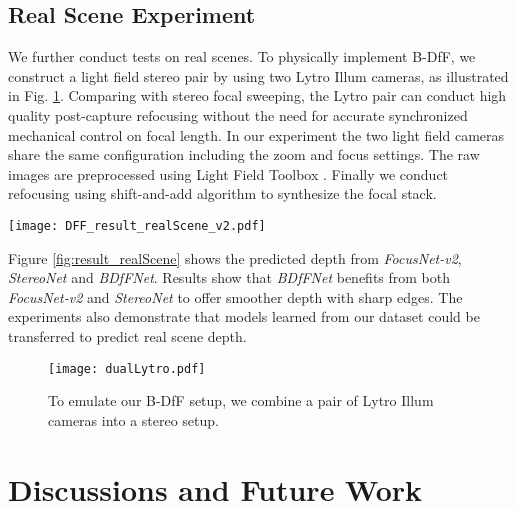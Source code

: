 \documentclass[10pt,twocolumn,letterpaper]{article}
\begin{document}
\subsection{Real Scene Experiment}
\label{section:realScene}
We further conduct tests on real scenes. To physically implement B-DfF, we construct a light field stereo pair by using two Lytro Illum cameras, as illustrated in Fig. \ref{fig:result_dualLytro}. Comparing with stereo focal sweeping, the Lytro pair can conduct high quality post-capture refocusing without the need for accurate synchronized mechanical control on focal length. In our experiment the two light field cameras share the same configuration including the zoom and focus settings. The raw images are preprocessed using Light Field Toolbox \cite{dansereau13}. Finally we conduct refocusing using shift-and-add algorithm \cite{ng05} to synthesize the focal stack.

\begin{figure*}[h]
\begin{center}
   \texttt{[image: DFF\_result\_realScene\_v2.pdf]}
\end{center}
\vspace{-8pt}
   \caption{Comparisons of real scene results from \emph{FocusNet-v2}, \emph{StereoNet} and \emph{BDfFNet}.}
\label{fig:result_realScene}
\end{figure*}

Figure \ref{fig:result_realScene} shows the predicted depth from \emph{FocusNet-v2}, \emph{StereoNet} and \emph{BDfFNet}. Results show that \emph{BDfFNet} benefits from both \emph{FocusNet-v2} and \emph{StereoNet} to offer smoother depth with sharp edges. The experiments also demonstrate that models learned from our dataset could be transferred to predict real scene depth.

\begin{figure}[t]
\begin{center}
   \texttt{[image: dualLytro.pdf]}
\end{center}
\vspace{-8pt}
   \caption{To emulate our B-DfF setup, we combine a pair of Lytro Illum cameras into a stereo setup.}
\label{fig:result_dualLytro}
\end{figure}




\section{Discussions and Future Work}
\label{section:conclusion}
\end{document}
